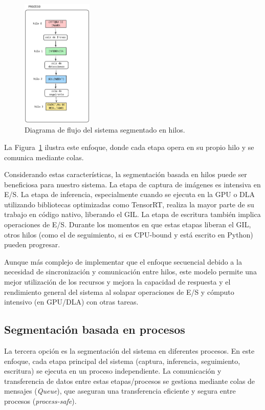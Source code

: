 \documentclass[11pt,spanish,listoffigures,listoftables]{tfgetsinf}
\begin{document}
\begin{figure}[H]
   \centering
   \includegraphics[width=0.3\textwidth]{images/diseno_e_implementacion/segmentacion_hilos.png}
   \caption{Diagrama de flujo del sistema segmentado en hilos.}
   \label{fig:hilos}

\end{figure}

La Figura~\ref{fig:hilos} ilustra este enfoque, donde cada etapa opera en su propio hilo y se comunica mediante colas.

Considerando estas características, la segmentación basada en hilos puede ser beneficiosa para nuestro sistema. La etapa de captura de imágenes es intensiva en E/S. La etapa de inferencia, especialmente cuando se ejecuta en la GPU o DLA utilizando bibliotecas optimizadas como TensorRT, realiza la mayor parte de su trabajo en código nativo, liberando el GIL. La etapa de escritura también implica operaciones de E/S. Durante los momentos en que estas etapas liberan el GIL, otros hilos (como el de seguimiento, si es CPU-bound y está escrito en Python) pueden progresar.

Aunque más complejo de implementar que el enfoque secuencial debido a la necesidad de sincronización y comunicación entre hilos, este modelo permite una mejor utilización de los recursos y mejora la capacidad de respuesta y el rendimiento general del sistema al solapar operaciones de E/S y cómputo intensivo (en GPU/DLA) con otras tareas.

\subsection{Segmentación basada en procesos}

La tercera opción es la segmentación del sistema en diferentes procesos. En este enfoque, cada etapa principal del sistema (captura, inferencia, seguimiento, escritura) se ejecuta en un proceso independiente. La comunicación y transferencia de datos entre estas etapas/procesos se gestiona mediante colas de mensajes (\textit{Queue}), que aseguran una transferencia eficiente y segura entre procesos (\textit{process-safe}).
\end{document}
